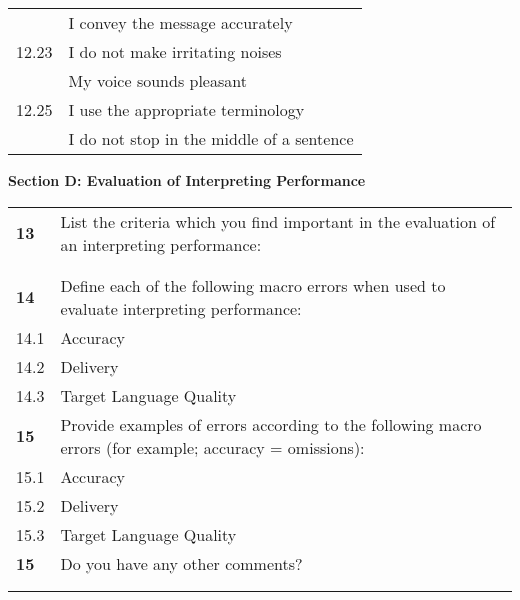 \documentclass[output=paper]{langsci/langscibook}
\begin{document}
\begin{paperappendix}
{\begin{center}
\begin{tabularx}{\textwidth}{Xp{}}
\rowcolor{lsLightGray!50}{\small 12.22} & \parbox[t]{.4\textwidth}{\small I convey the message accurately} \\
{\small 12.23} & \parbox[t]{.4\textwidth}{\small I do not make irritating noises} \\
 & \parbox[t]{.4\textwidth}{\small My voice sounds pleasant} \\
{\small 12.25} & \parbox[t]{.4\textwidth}{\small I use the appropriate terminology} \\
 & \parbox[t]{.4\textwidth}{\small I do not stop in the middle of a sentence} \\
\end{tabularx}
\end{center}

\textbf{Section D: Evaluation of Interpreting Performance}
\begin{center}
\begin{tabularx}{\textwidth}{Xp{}}
\rowcolor{lsLightGray} \textbf{13} & List the criteria which you find important in the evaluation of an interpreting performance: \\
  & \\
  & \\
\rowcolor{lsLightGray} \textbf{14} & Define each of the following macro errors when used to evaluate interpreting performance: \\
14.1 & Accuracy \\
14.2 & Delivery \\
14.3 & Target Language Quality \\
\rowcolor{lsLightGray} \textbf{15} & Provide examples of errors according to the following macro errors (for example; accuracy = omissions):\\
15.1 & Accuracy \\
15.2 & Delivery \\
15.3 & Target Language Quality \\
\rowcolor{lsLightGray} \textbf{15} & Do you have any other comments?\\
& \\
& \\
\end{tabularx}   
\end{center}
}

\newpage

\end{paperappendix}
\end{document}
